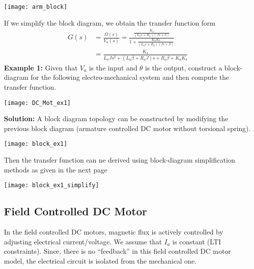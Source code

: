 \documentclass[twoside]{article}
\begin{document}
  \begin{minipage}[h]{1\linewidth}
    \begin{center}
      \texttt{[image: arm\_block]}
    \end{center}
  \end{minipage} 
  
  If we simplify the block diagram, we obtain the transfer function form
   \begin{align*}
   	G(s) &= \frac{\Omega(s)}{V_a(s)} = \frac{\frac{K_a}{(L_a s + R_a) (J s + \beta)} }{1 + \frac{K_a K_b}{(L_a s + R_a) (J s + \beta)}}
	\\
	&= \frac{K_a}{L_a J s^2 + ( L_a \beta + R_a J ) s + R_a \beta
          + K_a K_b}
   \end{align*}
   \textbf{Example 1:} Given that $V_a$ is the input and $\theta$ is the output, construct a block-diagram for the following electro-mechanical system and then compute the transfer function.
  
    \begin{minipage}[h]{1\linewidth}
    \begin{center}
      \texttt{[image: DC\_Mot\_ex1]}
    \end{center}
  \end{minipage} 
  
    \textbf{Solution:} A block diagram topology can be constructed by modifying the previous block diagram (armature controlled DC motor without torsional spring).
  
    \begin{minipage}[h]{1\linewidth}
    \begin{center}
      \texttt{[image: block\_ex1]}
    \end{center}
  \end{minipage} 
  
  Then the transfer function can ne derived using block-diagram simplification methods as given in the next page
  
      \begin{minipage}[h]{1\linewidth}
    \begin{center}
      \texttt{[image: block\_ex1\_simplify]}
    \end{center}
  \end{minipage} 
  
  \subsection{Field Controlled DC Motor}
%
In the field controlled DC motors, magnetic flux is actively controlled by adjusting
electrical current/voltage. We assume that $I_a$ is constant (LTI constraints). Since,
there is no ``feedback'' in this field controlled DC motor model, the electrical circuit
is isolated from the mechanical one. 
\end{document}
